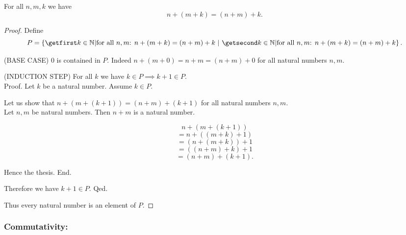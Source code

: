\documentclass[../../arithmetic.tex]{subfiles}
\begin{document}
  \begin{forthel}
    \begin{proposition}\label{Arithmetic_01_02_468785}
      For all $n,m,k$ we have \[ n + (m + k) = (n + m) + k. \]
    \end{proposition}
    \begin{proof}
      Define \[ P = \class{ k \in \Nat | \text{for all $n,m$: $n + (m + k) = (n + m) + k$}}. \]

      (BASE CASE) $0$ is contained in $P$.
      Indeed $n + (m + 0) = n + m = (n + m) + 0$ for all natural numbers $n,m$.

      (INDUCTION STEP) For all $k$ we have $k \in P \implies k + 1 \in P$. \\
      Proof.
        Let $k$ be a natural number.
         Assume $k \in P$.

        Let us show that $n + (m + (k + 1)) = (n + m) + (k + 1)$ for all natural numbers $n,m$. \\
          Let $n,m$ be natural numbers.
          Then $n + m$ is a natural number.

          \[   n + (m + (k + 1)) \]
          \[ = n + ((m + k) + 1) \]  %
          \[ = (n + (m + k)) + 1 \]  %
          \[ = ((n + m) + k) + 1 \]  %
          \[ = (n + m) + (k + 1). \] %

          Hence the thesis.
        End.

        Therefore we have $k + 1 \in P$.
      Qed.

      Thus every natural number is an element of $P$.
    \end{proof}
  \end{forthel}


  \subsubsection*{Commutativity:}
\end{document}
